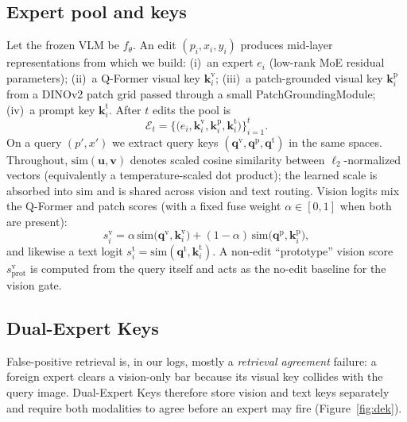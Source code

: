 \documentclass[letterpaper]{article} %
\begin{document}
\subsection{Expert pool and keys}
Let the frozen VLM be $f_\theta$.
An edit $(p_i,x_i,y_i)$ produces mid-layer representations from which we build:
(i)~an expert $e_i$ (low-rank MoE residual parameters);
(ii)~a Q-Former visual key $\mathbf{k}^{\mathrm{v}}_i$;
(iii)~a patch-grounded visual key $\mathbf{k}^{\mathrm{p}}_i$ from a DINOv2 patch grid passed through a small PatchGroundingModule;
(iv)~a prompt key $\mathbf{k}^{\mathrm{t}}_i$.
After $t$ edits the pool is
\begin{equation}
\mathcal{E}_t=\bigl\{\bigl(e_i,\mathbf{k}^{\mathrm{v}}_i,\mathbf{k}^{\mathrm{p}}_i,\mathbf{k}^{\mathrm{t}}_i\bigr)\bigr\}_{i=1}^{t}.
\label{eq:pool}
\end{equation}
On a query $(p',x')$ we extract query keys $(\mathbf{q}^{\mathrm{v}},\mathbf{q}^{\mathrm{p}},\mathbf{q}^{\mathrm{t}})$ in the same spaces.
Throughout, $\mathrm{sim}(\mathbf{u},\mathbf{v})$ denotes scaled cosine similarity between $\ell_2$-normalized vectors (equivalently a temperature-scaled dot product); the learned scale is absorbed into $\mathrm{sim}$ and is shared across vision and text routing.
Vision logits mix the Q-Former and patch scores (with a fixed fuse weight $\alpha\!\in\![0,1]$ when both are present):
\begin{equation}
s^{\mathrm{v}}_i
=
\alpha\,\mathrm{sim}\!\bigl(\mathbf{q}^{\mathrm{v}},\mathbf{k}^{\mathrm{v}}_i\bigr)
+
(1-\alpha)\,\mathrm{sim}\!\bigl(\mathbf{q}^{\mathrm{p}},\mathbf{k}^{\mathrm{p}}_i\bigr),
\label{eq:vis-logit}
\end{equation}
and likewise a text logit $s^{\mathrm{t}}_i=\mathrm{sim}(\mathbf{q}^{\mathrm{t}},\mathbf{k}^{\mathrm{t}}_i)$.
A non-edit ``prototype'' vision score $s^{\mathrm{v}}_{\mathrm{prot}}$ is computed from the query itself and acts as the no-edit baseline for the vision gate.

\subsection{Dual-Expert Keys}
False-positive retrieval is, in our logs, mostly a \emph{retrieval agreement} failure: a foreign expert clears a vision-only bar because its visual key collides with the query image.
Dual-Expert Keys therefore store vision and text keys separately and require both modalities to agree before an expert may fire (Figure~\ref{fig:dek}).
\end{document}
